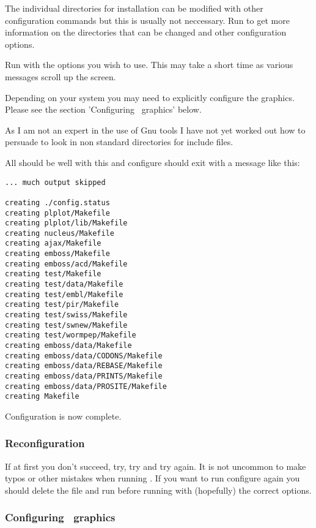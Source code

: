 \documentclass{report}
\begin{document}
The individual directories for installation can be modified with other configuration commands but this is usually not neccessary. Run  to get more information on the directories that can be changed and other configuration options.

Run  with the options you wish to use. This may take a short time as various messages scroll up the screen.

Depending on your system you may need to explicitly configure the graphics. Please see the section 'Configuring \EMBOSS\ graphics' below. 

As I am not an expert in the use of Gnu tools I have not yet worked out how to persuade  to look in non standard directories for include files.

All should be well with this and configure should exit with a message like this:
\begin{verbatim}
... much output skipped

creating ./config.status
creating plplot/Makefile
creating plplot/lib/Makefile
creating nucleus/Makefile
creating ajax/Makefile
creating emboss/Makefile
creating emboss/acd/Makefile
creating test/Makefile
creating test/data/Makefile
creating test/embl/Makefile
creating test/pir/Makefile
creating test/swiss/Makefile
creating test/swnew/Makefile
creating test/wormpep/Makefile
creating emboss/data/Makefile
creating emboss/data/CODONS/Makefile
creating emboss/data/REBASE/Makefile
creating emboss/data/PRINTS/Makefile
creating emboss/data/PROSITE/Makefile
creating Makefile
\end{verbatim}
Configuration is now complete.

\subsubsection{Reconfiguration}

If at first you don't succeed, try, try and try again. It is not uncommon to make typos or other mistakes when running . If you want to run configure again you should delete the file  and run  before running  with (hopefully) the correct options.


\subsubsection{Configuring \EMBOSS\ graphics}
\end{document}
